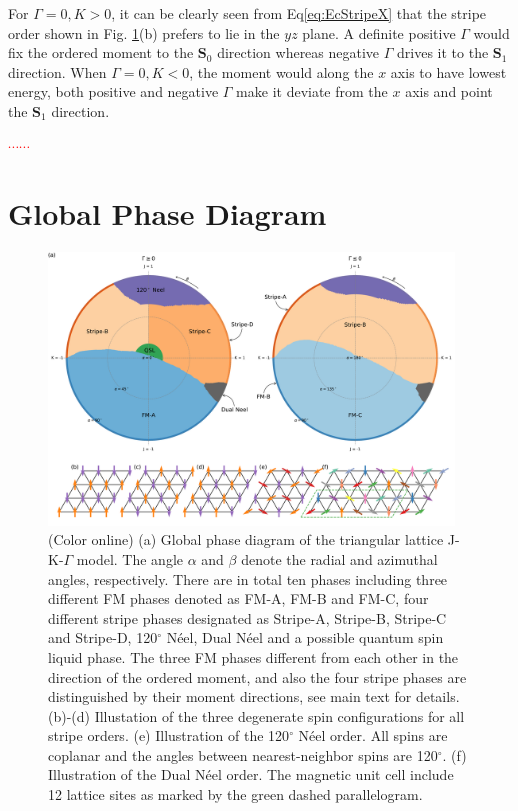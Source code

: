 \documentclass[aps,prb,reprint,groupedaddress,showpacs,amsfonts,amsmath,amssymb,superscriptaddress]{revtex4-1}
\begin{document}
For $\Gamma=0, K>0$, it can be clearly seen from Eq\eqref{eq:EcStripeX} that the stripe order shown in Fig. \ref{fig:PhaseDiagram}(b) prefers to lie in the $yz$ plane. A definite positive $\Gamma$ would fix the ordered moment to the $\mathbf{S}_0$ direction whereas negative $\Gamma$ drives it to the $\mathbf{S}_1$ direction. When $\Gamma=0, K<0$, the moment would along the $x$ axis to have lowest energy, both positive and negative $\Gamma$ make it deviate from the $x$ axis and point the $\mathbf{S}_1$ direction.

\textcolor{red}{$\cdots \cdots$}

\section{Global Phase Diagram}
\begin{figure}
    \centering
    \includegraphics[width=0.96\textwidth]{Fig2.pdf}
    \caption{(Color online) (a) Global phase diagram of the triangular lattice J-K-$\Gamma$ model. The angle $\alpha$ and $\beta$ denote the radial and azimuthal angles, respectively. There are in total ten phases including three different FM phases denoted as FM-A, FM-B and FM-C, four different stripe phases designated as Stripe-A, Stripe-B, Stripe-C and Stripe-D, 120$^\circ$ N\'{e}el, Dual N\'{e}el and a possible quantum spin liquid phase. The three FM phases different from each other in the direction of the ordered moment, and also the four stripe phases are distinguished by their moment directions, see main text for details. (b)-(d) Illustation of the three degenerate spin configurations for all stripe orders. (e) Illustration of the 120$^\circ$ N\'{e}el order. All spins are coplanar and the angles between nearest-neighbor spins are 120$^\circ$. (f) Illustration of the Dual N\'{e}el order. The magnetic unit cell include 12 lattice sites as marked by the green dashed parallelogram.}
     \label{fig:PhaseDiagram}
\end{figure}
\end{document}
